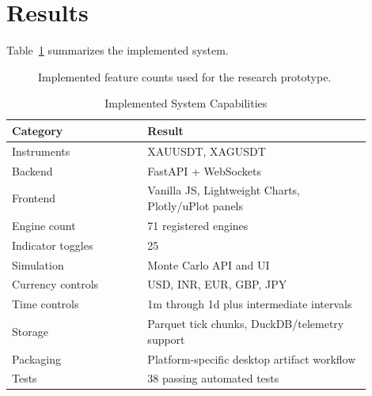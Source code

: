 \documentclass[conference]{IEEEtran}
\begin{document}
\section{Results}

Table~\ref{tab:results} summarizes the implemented system.

\begin{figure}[!t]
\centering
{}
\caption{Implemented feature counts used for the research prototype.}
\label{fig:implemented-counts}
\end{figure}

\begin{table}[!t]
\caption{Implemented System Capabilities}
\label{tab:results}
\centering
\begin{tabular}{@{}p{0.34\linewidth}p{0.56\linewidth}@{}}
\toprule
\textbf{Category} & \textbf{Result} \\
\midrule
Instruments & XAUUSDT, XAGUSDT \\
Backend & FastAPI + WebSockets \\
Frontend & Vanilla JS, Lightweight Charts, Plotly/uPlot panels \\
Engine count & 71 registered engines \\
Indicator toggles & 25 \\
Simulation & Monte Carlo API and UI \\
Currency controls & USD, INR, EUR, GBP, JPY \\
Time controls & 1m through 1d plus intermediate intervals \\
Storage & Parquet tick chunks, DuckDB/telemetry support \\
Packaging & Platform-specific desktop artifact workflow \\
Tests & 38 passing automated tests \\
\bottomrule
\end{tabular}
\end{table}
\end{document}
